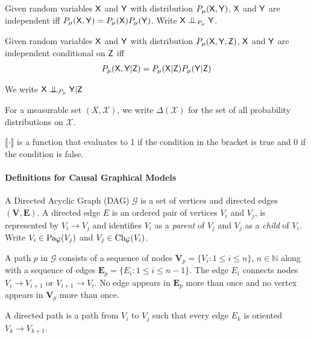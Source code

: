 \begin{definition}[Independence]
Given random variables $\mathsf{X}$ and $\mathsf{Y}$ with distribution $P_\mu(\mathsf{X,Y})$, $\mathsf{X}$ and $\mathsf{Y}$ are independent iff $P_\mu(\mathsf{X,Y})=P_\mu(\mathsf{X})P_\mu(\mathsf{Y})$. Write $\RV{X}\CI_{P_\mu}\RV{Y}$.

\end{definition}

\begin{definition}


Given random variables $\mathsf{X}$ and $\mathsf{Y}$ with distribution $P_\mu(\mathsf{X},\mathsf{Y},\mathsf{Z})$, $\mathsf{X}$ and $\mathsf{Y}$ are independent conditional on $\mathsf{Z}$ iff 
\begin{align*}
    P_\mu(\mathsf{X},\mathsf{Y}|\mathsf{Z}) = P_\mu(\mathsf{X}|\mathsf{Z})P_\mu(\mathsf{Y}|\mathsf{Z})  
\end{align*}

We write $\RV{X}\CI_{P_\mu} \RV{Y} | \RV{Z}$
\end{definition}


\begin{definition}
For a measurable set $(X,\mathcal{X})$, we write $\Delta(\mathcal{X})$ for the set of all probability distributions on $\mathcal{X}$.
\end{definition}

\begin{definition}
$\llbracket \cdot \rrbracket$ is a function that evaluates to 1 if the condition in the bracket is true and 0 if the condition is false.
\end{definition}


\paragraph{Definitions for Causal Graphical Models}

\begin{definition}
A Directed Acyclic Graph (DAG) $\mathcal{G}$ is a set of vertices and directed edges $(\mathbf{V},\mathbf{E})$. A directed edge $E$ is an ordered pair of vertices $V_i$ and $V_j$, is represented by $V_i \to V_j$ and identifies $V_i$ as a \emph{parent} of $V_j$ and $V_j$ as a \emph{child} of $V_i$. Write $V_i\in \text{Pa}_{\mathcal{G}}(V_j)$ and $V_j\in\text{Ch}_{\mathcal{G}}(V_i)$.
\end{definition}

\begin{definition}
A path $p$ in $\mathcal{G}$ consists of a sequence of nodes $\mathbf{V}_p=\{V_i:1\leq i \leq n\}$, $n\in\mathbb{N}$ along with a sequence of edges $\mathbf{E}_p=\{E_i:1\leq i \leq n-1\}$. The edge $E_i$ connects nodes $V_i\to V_{i+1}$ or $V_{i+1}\to V_i$. No edge appears in $\mathbf{E}_p$ more than once and no vertex appears in $\mathbf{V}_p$ more than once.

A directed path is a path from $V_i$ to $V_j$ such that every edge $E_k$ is oriented  $V_k\to V_{k+1}$.
\end{definition}

